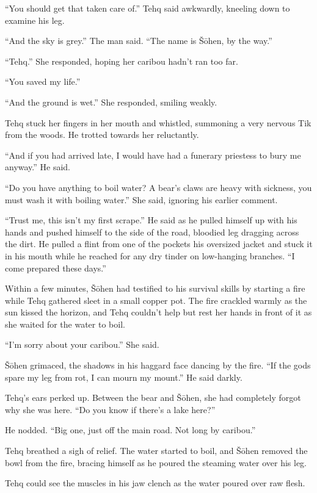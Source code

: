 ``You should get that taken care of.'' Tehq said awkwardly, kneeling down to examine his leg.

``And the sky is grey.'' The man said. ``The name is Šōhen, by the way.''

``Tehq.'' She responded, hoping her caribou hadn't ran too far.

``You saved my life.''

``And the ground is wet.'' She responded, smiling weakly.

Tehq stuck her fingers in her mouth and whistled, summoning a very nervous Tik from the woods. He trotted towards her reluctantly.

``And if you had arrived late, I would have had a funerary priestess to bury me anyway.'' He said.

``Do you have anything to boil water? A bear's claws are heavy with sickness, you must wash it with boiling water.'' She said, ignoring his earlier comment.

``Trust me, this isn't my first scrape.'' He said as he pulled himself up with his hands and pushed himself to the side of the road, bloodied leg dragging across the dirt. He pulled a flint from one of the pockets his oversized jacket and stuck it in his mouth while he reached for any dry tinder on low-hanging branches. ``I come prepared these days.''

Within a few minutes, Šōhen had testified to his survival skills by starting a fire while Tehq gathered sleet in a small copper pot. The fire crackled warmly as the sun kissed the horizon, and Tehq couldn't help but rest her hands in front of it as she waited for the water to boil.

``I'm sorry about your caribou.'' She said.

Šōhen grimaced, the shadows in his haggard face dancing by the fire. ``If the gods spare my leg from rot, I can mourn my mount.'' He said darkly.

Tehq's ears perked up. Between the bear and Šōhen, she had completely forgot why she was here. ``Do you know if there's a lake here?''

He nodded. ``Big one, just off the main road. Not long by caribou.''

Tehq breathed a sigh of relief. The water started to boil, and Šōhen removed the bowl from the fire, bracing himself as he poured the steaming water over his leg.

Tehq could see the muscles in his jaw clench as the water poured over raw flesh.

